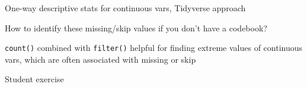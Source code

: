 \documentclass[8pt,ignorenonframetext,dvipsnames]{beamer}
\newenvironment{Shaded}{\begin{snugshade}}{\end{snugshade}}
\newcommand{\KeywordTok}[1]{\textcolor[rgb]{0.13,0.29,0.53}{\textbf{#1}}}
\newcommand{\DecValTok}[1]{\textcolor[rgb]{0.00,0.00,0.81}{#1}}
\newcommand{\StringTok}[1]{\textcolor[rgb]{0.31,0.60,0.02}{#1}}
\newcommand{\CommentTok}[1]{\textcolor[rgb]{0.56,0.35,0.01}{\textit{#1}}}
\newcommand{\OperatorTok}[1]{\textcolor[rgb]{0.81,0.36,0.00}{\textbf{#1}}}
\newcommand{\NormalTok}[1]{#1}
\renewcommand{\textbf}[1]{{\color{darkgray}\bfseries\fontfamily{Montserrat-TOsF}#1}}
\begin{document}
\begin{frame}[fragile]{One-way descriptive stats for continuous vars,
Tidyverse approach}

How to identify these missing/skip values if you don't have a codebook?

\texttt{count()} combined with \texttt{filter()} helpful for finding
extreme values of continuous vars, which are often associated with
missing or skip

\begin{Shaded}
\end{Shaded}

\end{frame}

\begin{frame}{Student exercise}

\end{frame}
\end{document}
